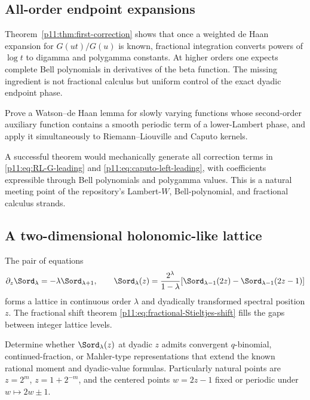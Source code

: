\documentclass[11pt,oneside]{article}
\theoremstyle{definition}
\theoremstyle{remark}
\newcommand{\1}{\mathbf 1}
\begin{document}
\subsection{All-order endpoint expansions}

Theorem~\ref{p11:thm:first-correction} shows that once a weighted de Haan expansion for
$G(ut)/G(u)$ is known, fractional integration converts powers of $\log t$ to
digamma and polygamma constants.  At higher orders one expects complete Bell
polynomials in derivatives of the beta function.  The missing ingredient is
not fractional calculus but uniform control of the exact dyadic endpoint
phase.

\begin{problem}
Prove a Watson--de Haan lemma for slowly varying functions whose second-order
auxiliary function contains a smooth periodic term of a lower-Lambert phase,
and apply it simultaneously to Riemann--Liouville and Caputo kernels.
\end{problem}

A successful theorem would mechanically generate all correction terms in
\eqref{p11:eq:RL-G-leading} and \eqref{p11:eq:caputo-left-leading}, with coefficients
expressible through Bell polynomials and polygamma values.  This is a natural
meeting point of the repository's Lambert-$W$, Bell-polynomial, and fractional
calculus strands.

\subsection{A two-dimensional holonomic-like lattice}

The pair of equations
\begin{equation}
 \partial_z\Sord_\lambda=-\lambda\Sord_{\lambda+1},
 \qquad
 \Sord_\lambda(z)=\frac{2^\lambda}{1-\lambda}
 [\Sord_{\lambda-1}(2z)-\Sord_{\lambda-1}(2z-1)]
\end{equation}
forms a lattice in continuous order $\lambda$ and dyadically transformed
spectral position $z$.  The fractional shift theorem
\eqref{p11:eq:fractional-Stieltjes-shift} fills the gaps between integer lattice
levels.

\begin{problem}
Determine whether $\Sord_\lambda(z)$ at dyadic $z$ admits convergent
$q$-binomial, continued-fraction, or Mahler-type representations that extend
the known rational moment and dyadic-value formulas.  Particularly natural
points are $z=2^m$, $z=1+2^{-m}$, and the centered points $w=2z-1$ fixed or
periodic under $w\mapsto2w\pm1$.
\end{problem}
\end{document}
